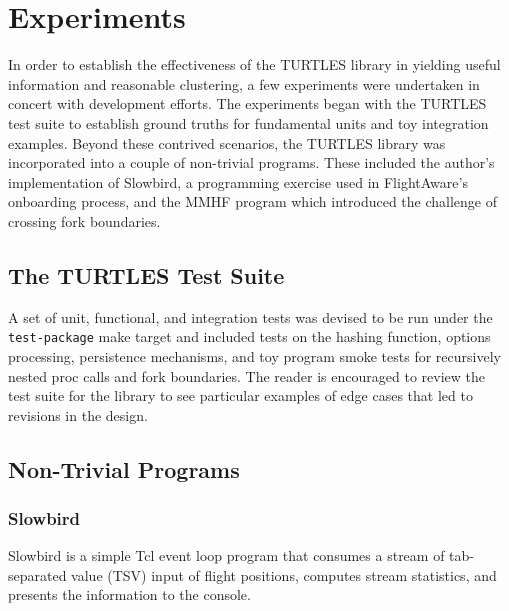 \documentclass{article}[letter,10pt]
\begin{document}
\section{Experiments}{
  In order to establish the effectiveness of the TURTLES library in yielding useful information and reasonable clustering,
  a few experiments were undertaken in concert with development efforts. The experiments began with the TURTLES test suite
  to establish ground truths for fundamental units and toy integration examples. Beyond these contrived scenarios, the TURTLES
  library was incorporated into a couple of non-trivial programs. These included the author's implementation of Slowbird, a
  programming exercise used in FlightAware's onboarding process, and the MMHF program which introduced the challenge of
  crossing fork boundaries.

  \subsection{The TURTLES Test Suite}{
    A set of unit, functional, and integration tests was devised to be run under the \texttt{test-package} make target and
    included tests on the hashing function, options processing, persistence mechanisms, and toy program smoke tests
    for recursively nested proc calls and fork boundaries. The reader is encouraged to review the test
    suite for the library to see particular examples of edge cases that led to revisions in the design.
  }

  \subsection{Non-Trivial Programs}{

    \subsubsection{Slowbird}{
      Slowbird is a simple Tcl event loop program that consumes a stream of tab-separated value (TSV) input of flight
      positions, computes stream statistics, and presents the information to the console.

}}}
\end{document}
